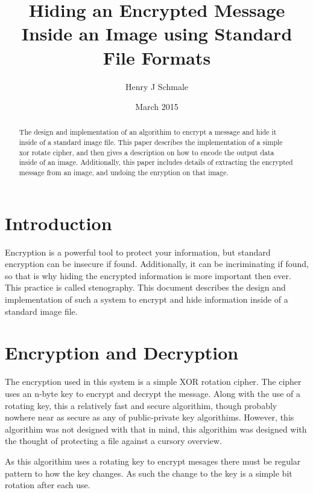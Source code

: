 \documentclass[12pt]{article}
\begin{document}
\title{Hiding an Encrypted Message Inside an Image using
      Standard File Formats}
\author{Henry J Schmale}
\date{March 2015}
\maketitle

\begin{abstract}
  The design and implementation of an algorithim to encrypt a message
  and hide it inside of a standard image file. This paper describes
  the implementation of a simple xor rotate cipher, and then gives
  a description on how to encode the output data inside of an image.
  Additionally, this paper includes details of extracting the
  encrypted message from an image, and undoing the enryption on that
  image.
\end{abstract}

\newpage
\tableofcontents                       %
\newpage

\section{Introduction}
  Encryption is a powerful tool to protect your information, but standard
  encryption can be insecure if found. Additionally, it can be incriminating
  if found, so that is why hiding the encrypted information is more important
  then ever. This practice is called stenography. This document describes the
  design and implementation of such a system to encrypt and hide information
  inside of a standard image file. 

\section{Encryption and Decryption}
  The encryption used in this system is a simple XOR rotation cipher.
  The cipher uses an n-byte key to encrypt and decrypt the message.
  Along with the use of a rotating key, this a relatively fast and
  secure algorithim, though probably nowhere near as secure as any of
  public-private key algorithims. However, this algorithim was not
  designed with that in mind, this algorithim was designed with the
  thought of protecting a file against a cursory overview.
  
  As this algorithim uses a rotating key to encrypt mesages there
  must be regular pattern to how the key changes. As such the
  change to the key is a simple bit rotation after each use. 
\end{document}
